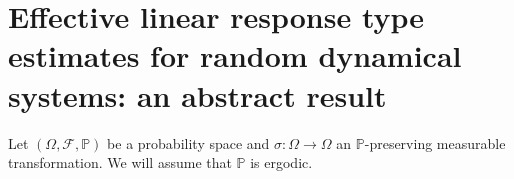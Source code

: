 \documentclass[11pt,reqno,a4paper]{article}
\theoremstyle{special}
\def\om{\omega}
\begin{document}







 
\section{Effective linear response type estimates for random dynamical systems: an abstract result}\label{LR}
Let $(\Omega, \mathcal F, \mathbb P)$ be a probability space and $\sigma \colon \Omega \to \Omega$ an $\mathbb P$-preserving measurable transformation. We will assume that $\mathbb P$ is ergodic.
\end{document}
